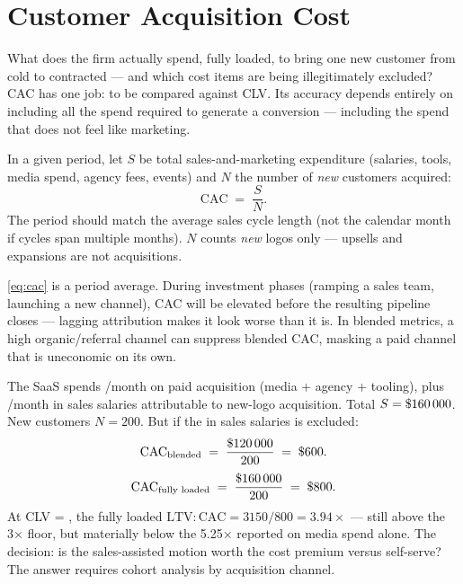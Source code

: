 \section{Customer Acquisition Cost}\label{sec:cac}

What does the firm actually spend, fully loaded, to bring one new customer from cold to contracted --- and which cost items are being illegitimately excluded? CAC has one job: to be compared against CLV. Its accuracy depends entirely on including all the spend required to generate a conversion --- including the spend that does not feel like marketing.

In a given period, let \(S\) be total sales-and-marketing expenditure (salaries, tools, media spend, agency fees, events) and \(N\) the number of \emph{new} customers acquired:
\begin{equation}\label{eq:cac}
  \mathrm{CAC} \;=\; \frac{S}{N} .
\end{equation}
The period should match the average sales cycle length (not the calendar month if cycles span multiple months). \(N\) counts \emph{new} logos only --- upsells and expansions are not acquisitions.

\cref{eq:cac} is a period average. During investment phases (ramping a sales team, launching a new channel), CAC will be elevated before the resulting pipeline closes --- lagging attribution makes it look worse than it is. In blended metrics, a high organic/referral channel can suppress blended CAC, masking a paid channel that is uneconomic on its own.

\begin{example}
The SaaS spends /month on paid acquisition (media + agency + tooling), plus /month in sales salaries attributable to new-logo acquisition. Total \(S = \$\num{160000}\). New customers \(N = 200\). But if the  in sales salaries is excluded:
\[
  \mathrm{CAC}_{\text{blended}} \;=\; \frac{\$\num{120000}}{200} \;=\; \$\num{600}.
\]
\[
  \mathrm{CAC}_{\text{fully\ loaded}} \;=\; \frac{\$\num{160000}}{200} \;=\; \$\num{800}.
\]
At CLV = , the fully loaded \(\mathrm{LTV:CAC} = 3150/800 = 3.94\times\) --- still above the 3× floor, but materially below the 5.25× reported on media spend alone. The decision: is the sales-assisted motion worth the cost premium versus self-serve? The answer requires cohort analysis by acquisition channel.
\end{example}

